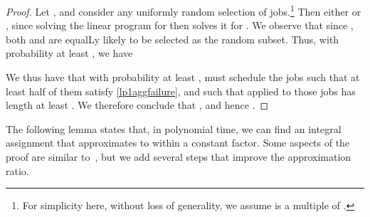 {\begin{proof}
{  Let , and consider any uniformly
  random selection  of  jobs.\footnote{For
    simplicity here, without loss of generality, we assume  is a
    multiple of .}  Then either 
  or , since solving the linear
  program for  then  solves it for .  We observe that
  since , both  and  are
  equalLy likely to be selected as the random subset.  Thus, with
  probability at least , we have 
  
  We thus have that with probability at least ,  must schedule the jobs such that at least half of them
  satisfy \eqref{lp1aggfailure}, and such that  applied to
  those jobs has length at least .  We therefore conclude that
  , and hence .
}
\end{proof}
}

The following lemma states that, in polynomial time, we can find an integral
assignment that approximates  to within a constant factor.
Some aspects of the proof are similar to~\cite[Theorem 4.1]{LinRa07},
 but we add several steps  that improve the
approximation ratio.  

